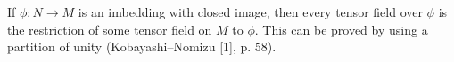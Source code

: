 If $\phi: N \rightarrow M$ is an imbedding with closed image, then every tensor field over $\phi$ is the restriction of some tensor field on $M$ to $\phi$. This can be proved by using a partition of unity (Kobayashi--Nomizu [1], p. 58).
